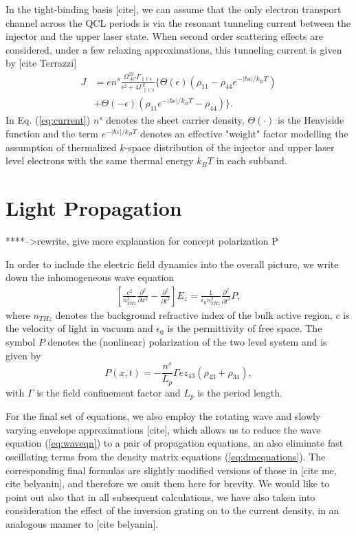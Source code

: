\documentclass[11pt,final]{scrbook}
\def\p{\partial}
\begin{document}
In the tight-binding basis [cite], we can assume that the only electron transport channel across the QCL periods is via the resonant tunneling current between the injector and the upper laser state. When second order scattering effects are considered, under a few relaxing approximations, this tunneling current is given by [cite Terrazzi]
\begin{align}
\label{eq:current}
J &= en^s\frac{\Omega_{AC}^22\Gamma_{\parallel 1'4}}{\epsilon^2+4\Gamma_{\parallel 1'4}^2}\Big\{\Theta(\epsilon)(\rho_{11}-\rho_{44}e^{-|\hbar\epsilon|/k_BT}) \nonumber \\
&+\Theta(-\epsilon)(\rho_{11}e^{-|\hbar\epsilon|/k_BT}-\rho_{44})\Big\}.
\end{align}
In Eq. (\ref{eq:current}) $n^s$ denotes the sheet carrier density, $\Theta(\cdot)$ is the Heaviside function and the term $e^{-|\hbar\epsilon|/k_BT}$ denotes an effective "weight" factor modelling the assumption of thermalized $k$-space distribution of the injector and upper laser level electrons with the same thermal energy $k_BT$ in each subband.   

\section{Light Propagation}
****-->rewrite, give more explanation for concept polarization P

In order to include the electric field dynamics into the overall picture, we write down the inhomogeneous wave equation 
\begin{align}
\label{eq:waveqn}
\left [\frac{c^2}{n_{THz}^2} \frac{\p^2}{\p x^2} -\frac{\p^2}{\p t^2} \right ] E_z =\frac{1}{\epsilon_0 n_{THz}^2}\frac{\p^2}{\p t^2}P,
\end{align}
where  $n_{THz}$ denotes the background refractive index of the bulk active region, $c$ is the velocity of light in vacuum and $\epsilon_0$ is the permittivity of free space. The symbol $P$ denotes the (nonlinear) polarization of the two level system and is given by 
\begin{equation}
P(x,t) =  -\frac{n^s}{L_p}\Gamma ez_{43} (\rho_{43}+\rho_{34}),  
\end{equation}
with $\Gamma$ is the field confinement factor and $L_p$ is the period length. 

For the final set of equations, we also employ the rotating wave and slowly varying envelope approximations [cite], which allows us to reduce  the wave equation (\ref{eq:waveqn}) to a pair of propagation equations, an also eliminate fast oscillating terms from the density matrix equations (\ref{eq:dmequations}). The corresponding final formulas are slightly modified versions of those in [cite me, cite belyanin], and therefore we omit them here for brevity. We would like to point out also that in all subsequent calculations, we have also taken into consideration the effect of the inversion grating on to the current density, in an analogous manner to [cite belyanin]. 
\end{document}
